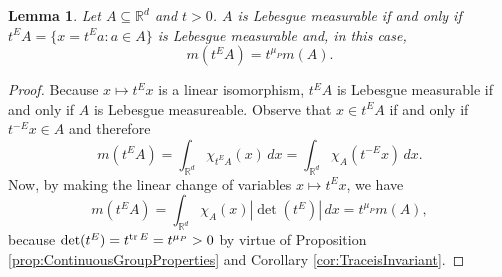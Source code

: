\documentclass[11pt]{article}
\newtheorem{lemma}[theorem]{Lemma}
\renewcommand\det{\operatorname{det}}
\begin{document}
\begin{lemma}\label{lemma:Scaling}
Let $A\subseteq\mathbb{R}^d$ and $t>0$.  $A$ is Lebesgue measurable if and only if $t^E A=\{x=t^E a:a\in A\}$ is Lebesgue measurable and, in this case,
\begin{equation*}
m(t^E A)=t^{\mu_P}m(A).
\end{equation*}
\end{lemma}
\begin{proof}
Because $x\mapsto t^E x$ is a linear isomorphism, $t^E A$ is Lebesgue measurable if and only if $A$ is Lebesgue measureable. Observe that $x\in t^E A$ if and only if $t^{-E}x\in A$ and therefore
\begin{equation*}
m(t^E A)=\int_{\mathbb{R}^d}\chi_{t^E A}(x)\,dx=\int_{\mathbb{R}^d}\chi_{A}(t^{-E}x)\,dx.
\end{equation*}
Now, by making the linear change of variables $x\mapsto t^E x$, we have
\begin{equation*}
m(t^E A)=\int_{\mathbb{R}^d}\chi_A(x)|\det(t^E)|\,dx=t^{\mu_P}m(A),
\end{equation*}
because $\det(t^E)=t^{\tr E}=t^{\mu_P}>0$ by virtue of Proposition \ref{prop:ContinuousGroupProperties} and Corollary \ref{cor:TraceisInvariant}.
\end{proof}
\end{document}
